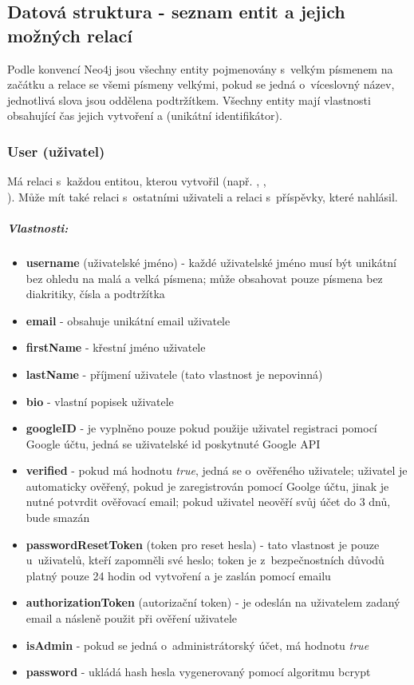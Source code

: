 \documentclass[12pt, a4paper,
  oneside,      %
]{report}
\newenvironment{propertiesItemize}{
\begin{itemize}{ 
  }}
  {\end{itemize}}
\begin{document}
\subsection{Datová struktura - seznam entit a jejich možných relací}
Podle konvencí Neo4j jsou všechny entity pojmenovány s~velkým písmenem na začátku a relace se všemi písmeny velkými, pokud se jedná o~víceslovný název, jednotlivá slova jsou oddělena podtržítkem. \cite{Neo4jNamingRules}
Všechny entity mají vlastnosti  obsahující čas jejich vytvoření a  (unikátní identifikátor).
\clearpage
\subsubsection{User (uživatel)}  Má relaci  s~každou entitou, kterou vytvořil (např. , ,\\ ). Může mít také relaci  s~ostatními uživateli a relaci  s~příspěvky, které nahlásil.
\subparagraph{Vlastnosti:}
\begin{propertiesItemize}
	\item \textbf{username} (uživatelské jméno) - každé uživatelské jméno musí být unikátní bez ohledu na malá a velká písmena; může obsahovat pouze písmena bez diakritiky, čísla a podtržítka
	\item \textbf{email} - obsahuje unikátní email uživatele
	\item \textbf{firstName} - křestní jméno uživatele
	\item \textbf{lastName} - příjmení uživatele (tato vlastnost je nepovinná)
	\item \textbf{bio} - vlastní popisek uživatele
	\item \textbf{googleID} - je vyplněno pouze pokud použije uživatel registraci pomocí Google účtu, jedná se uživatelské id poskytnuté Google API
	\item \textbf{verified} - pokud má hodnotu \textit{true}, jedná se o~ověřeného uživatele; uživatel je automaticky ověřený, pokud je zaregistrován pomocí Goolge účtu, jinak je nutné potvrdit ověřovací email; pokud uživatel neověří svůj účet do 3 dnů, bude smazán
	\item \textbf{passwordResetToken} (token pro reset hesla) - tato vlastnost je pouze u~uživatelů, kteří zapomněli své heslo; token je z~bezpečnostních důvodů platný pouze 24 hodin od vytvoření a je zaslán pomocí emailu
	\item \textbf{authorizationToken} (autorizační token) - je odeslán na uživatelem zadaný email a násleně použit při ověření uživatele
	\item \textbf{isAdmin} - pokud se jedná o~administrátorský účet, má hodnotu \textit{true}
	\item \textbf{password} - ukládá hash hesla vygenerovaný pomocí algoritmu bcrypt
\end{propertiesItemize}
\end{document}
